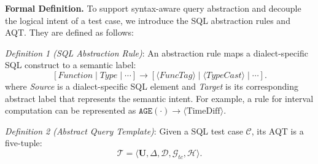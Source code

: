 \documentclass[conference]{IEEEtran}
\newtheorem{definition}{Definition}
\begin{document}
\textbf{Formal Definition.}
To support syntax-aware query abstraction and decouple the logical intent of a test case, we introduce the SQL abstraction rules and AQT. 
They are defined as follows:

\textit{Definition 1 (SQL Abstraction Rule)}: An abstraction rule maps a dialect-specific SQL construct to a semantic label:
\[
    [\textit{Function} \mid \textit{Type} \mid \cdots]
    \rightarrow
    [\langle \textit{FuncTag} \rangle \mid
     \langle \textit{TypeCast} \rangle \mid \cdots].
\]
where \textit{Source} is a dialect-specific SQL element and \textit{Target} is its corresponding abstract label that represents the semantic intent. For example, a rule for interval computation can be represented as $\texttt{AGE}(\cdot) \rightarrow \langle \text{TimeDiff} \rangle$.


\textit{Definition 2 (Abstract Query Template)}: Given a SQL test case $\mathcal{C}$, its AQT is a five-tuple:
\[
    \mathcal{T}=\langle \mathbf{U}, \Delta, \mathcal{D}, \mathcal{G}_{tc}, \mathcal{H} \rangle .
\]
\end{document}
